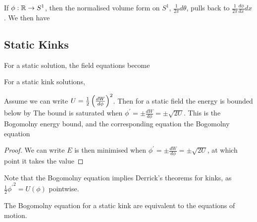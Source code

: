 \documentclass{article}
\begin{document}
\begin{example}
If $\phi:\mathbb{R} \to S^1$, then the normalised volume form on $S^1$, $\frac{1}{2\pi}d\theta$, pulls back to $\frac{1}{2\pi}\frac{d\phi}{dx}dx$. We then have 
\end{example}

\subsection{Static Kinks}

For a static solution, the field equations become

\begin{theorem}
For a static kink solutions, 
\end{theorem}

\begin{prop}
Assume we can write $U=\frac{1}{2}\left( \frac{dW}{d\phi} \right)^2$. Then for a static field the energy is bounded below by
The bound is saturated when $\phi^\prime = \pm \frac{dW}{d\phi} = \pm\sqrt{2U}$. This is the Bogomolny energy bound, and the corresponding equation the Bogomolny equation
\end{prop}
\begin{proof}
We can write 
$E$ is then minimised when $\phi^\prime = \pm \frac{dW}{d\phi} = \pm\sqrt{2U}$, at which point it takes the value 
\end{proof}

\begin{remark}
Note that the Bogomolny equation implies Derrick's theorems for kinks, as $\frac{1}{2}{\phi^\prime}^2 = U(\phi)$ pointwise. 
\end{remark}

\begin{prop}
The Bogomolny equation for a static kink are equivalent to the equations of motion. 
\end{prop}
\end{document}
